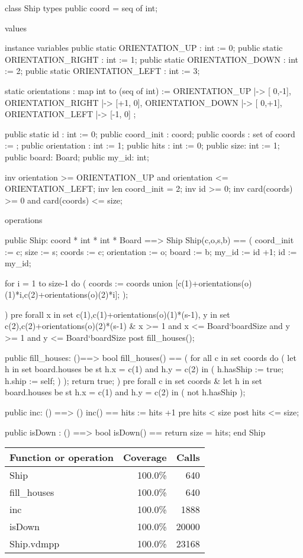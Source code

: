 \begin{vdm_al}
class Ship
 types
  public coord = seq of int;
  
 values
  
 instance variables
  public static ORIENTATION_UP : int := 0;
  public static ORIENTATION_RIGHT : int := 1;
  public static ORIENTATION_DOWN : int := 2;
  public static ORIENTATION_LEFT : int := 3;
  
  static orientations : map int to (seq of int) := {
   ORIENTATION_UP  |-> [ 0,-1],
   ORIENTATION_RIGHT |-> [+1, 0],
   ORIENTATION_DOWN |-> [ 0,+1],
   ORIENTATION_LEFT |-> [-1, 0]
  };
 
  public static id : int := 0;
  public coord_init : coord;
  public coords : set of coord := {};
  public orientation : int := 1;
  public hits : int := 0;
  public size: int := 1;
  public board: Board;
  public my_id: int;
  
  inv orientation >= ORIENTATION_UP and orientation <= ORIENTATION_LEFT;
  inv len coord_init = 2;
  inv id >= 0;
  inv card(coords) >= 0 and card(coords) <= size;
 
 operations
 
 public Ship: coord * int * int * Board ==> Ship
 Ship(c,o,s,b) == 
 (
  coord_init := c;
  size := s;
  coords := {c};
  orientation := o;
  board := b;
  my_id := id +1;
  id := my_id;
  
  for i = 1 to size-1 do ( 
   coords := coords union {[c(1)+orientations(o)(1)*i,c(2)+orientations(o)(2)*i]};
  );
  
 )
 pre forall x in set {c(1),c(1)+orientations(o)(1)*(s-1)}, y in set {c(2),c(2)+orientations(o)(2)*(s-1)} &
   x >= 1 and x <= Board`boardSize and y >= 1 and y <= Board`boardSize
 post fill_houses();
 
  
 public fill_houses: ()==> bool
  fill_houses() ==
  (
   for all c in set coords do
   (
    let h in set board.houses be st h.x = c(1) and h.y = c(2) in
    (
     h.hasShip := true;
     h.ship := self;
    )
   );
   return true;
  )
 pre forall c in set coords &
  let h in set board.houses be st h.x = c(1) and h.y = c(2) in
  (
   not h.hasShip
  );

 public inc: () ==> ()
  inc() == hits := hits +1
 pre hits < size
 post hits <= size;
 
 public isDown : () ==> bool
  isDown() == return size = hits;
end Ship
\end{vdm_al}
\bigskip
\begin{longtable}{|l|r|r|}
\hline
Function or operation & Coverage & Calls \\
\hline
\hline
Ship & 100.0\% & 640 \\
\hline
fill\_houses & 100.0\% & 640 \\
\hline
inc & 100.0\% & 1888 \\
\hline
isDown & 100.0\% & 20000 \\
\hline
\hline
Ship.vdmpp & 100.0\% & 23168 \\
\hline
\end{longtable}

